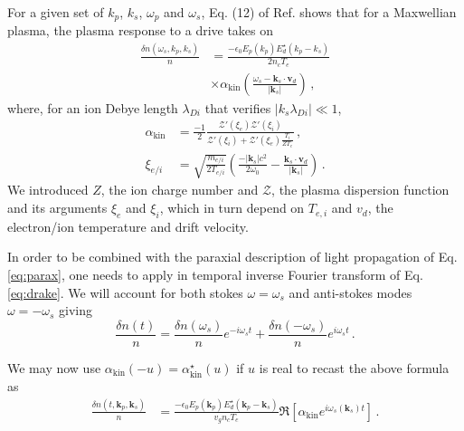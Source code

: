\documentclass[
 reprint,
 amsmath,amssymb,
 aps,
]{revtex4-1}
\begin{document}
For a given set of $k_p$, $k_s$, $\omega_p$ and $\omega_s$, Eq. (12) of  Ref. \cite[]{POF_Drake_1973} shows that  for  a Maxwellian plasma, the plasma response to a drive  takes on 
\begin{align}
 \frac{ \delta n (\omega_s, k_p,k_s) }{n}  &=   \frac{ -\epsilon_0 E_p(k_p) E_d^\star(k_p-k_s) }{ 2 n_c T_e } \nonumber \\  &\times \alpha_\mathrm{kin}\left(\frac{\omega_s- \mathbf{k}_s\cdot \mathbf{v}_d}{\vert \mathbf{k}_s \vert }\right)   \, ,\label{eq:drake}
 \end{align}
 where, for an ion Debye length $\lambda_{Di}$ that verifies $\vert k_s \lambda_{Di} \vert \ll 1$, %
 \begin{align}
\alpha_\mathrm{kin} &=  \frac{-1}{2}\frac{ \mathcal{Z}'( \xi_e)\mathcal{Z}'( \xi_i)    }{   \mathcal{Z}'( \xi_i) + \mathcal{Z}'( \xi_e)\frac{  T_i }{ ZT_e } }    \, , \label{eq:drakea}\\
\xi_{e/i } &=  \sqrt{ \frac{ m_{e/i } }{ 2T_{e/i }}  } \left( \frac{ -\vert \mathbf{k}_s\vert c^2  }{  2\omega_0 }  - \frac{    \mathbf{k}_s \cdot \mathbf{v}_d }{  \vert \mathbf{k}_s\vert }\right)  \label{eq:xiie}   \,  .
\end{align}
We introduced $Z$, the ion charge number and  $ \mathcal{Z}$, the plasma dispersion function \cite{Fried_Gell-Mann_1960} and its arguments $\xi_{e } $ and $\xi_{i }$, which in turn depend on $T_{e,i}$ and $v_d$, the electron/ion temperature and  drift velocity.

In order to be combined with the paraxial description of light propagation of Eq. \eqref{eq:parax}, one needs to apply in temporal inverse Fourier transform of Eq. \eqref{eq:drake}. We will account for both stokes $\omega=\omega_s$ and anti-stokes modes $\omega=-\omega_s$ giving 
\begin{equation}\label{eq:sa}
     \frac{ \delta n (t) }{n}= \frac{ \delta n (\omega_s) }{n}e^{-i\omega_st} + \frac{ \delta n (-\omega_s) }{n}e^{i\omega_st}\, .
\end{equation}

We may now use $\alpha_\mathrm{kin}(-u) = \alpha^\star_\mathrm{kin}(u) $ if $u$ is real to recast the above formula as 
\begin{align}
\frac{ \delta n (t,\mathbf{k}_p,\mathbf{k}_s ) }{n}  &=   \frac{ -\epsilon_0 E_p(\mathbf{k}_p) E_d^\star(\mathbf{k}_p-\mathbf{k}_s)  }{ v_g n_c T_e } 
 \Re \left[ \alpha_\mathrm{kin}  e^{ i\omega_s(\mathbf{k}_s) t} \right]  \, .\label{eq:drakef}
\end{align}
\end{document}
